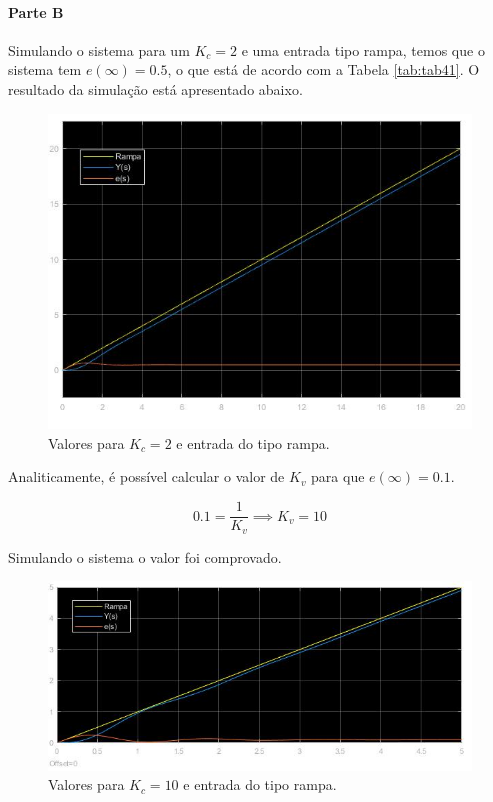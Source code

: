 \documentclass[
]{book}
\theoremstyle{definition}
\theoremstyle{definition}
\theoremstyle{definition}
\theoremstyle{remark}
\begin{document}
\hypertarget{parte-b-1}{%
\paragraph*{Parte B}\label{parte-b-1}}

Simulando o sistema para um \(K_c = 2\) e uma entrada tipo rampa, temos que o sistema tem \(e(\infty) = 0.5\), o que está de acordo com a Tabela \ref{tab:tab41}. O resultado da simulação está apresentado abaixo.

\begin{figure}
\includegraphics[width=0.8\linewidth]{Imagens/Lab4/Resolução/prob2B1} \caption{Valores para $K_c = 2$ e entrada do tipo rampa.}\label{fig:fig42B1}
\end{figure}

Analiticamente, é possível calcular o valor de \(K_v\) para que \(e(\infty) = 0.1\).

\[
0.1 = \frac {1}{K_v} \implies K_v = 10
\]

Simulando o sistema o valor foi comprovado.

\begin{figure}
\includegraphics[width=0.8\linewidth]{Imagens/Lab4/Resolução/prob2B2} \caption{Valores para $K_c = 10$ e entrada do tipo rampa.}\label{fig:fig42B2}
\end{figure}
\end{document}
